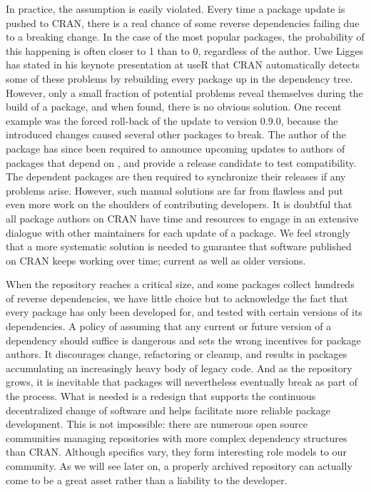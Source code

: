 In practice, the assumption is easily violated. Every time a package update is
pushed to CRAN, there is a real chance of some reverse dependencies failing due
to a breaking change. In the case of the most popular packages, the probability
of this happening is often closer to 1 than to 0, regardless of the author. Uwe
Ligges has stated in his keynote presentation at useR that CRAN automatically
detects some of these problems by rebuilding every package up in the dependency
tree. However, only a small fraction of potential problems reveal themselves
during the build of a package, and when found, there is no obvious solution. One
recent example was the forced roll-back of the  \citep{ggplot2}
update to version 0.9.0, because the introduced changes caused several other
packages to break. The author of the  package has since been
required to announce upcoming updates to authors of packages that depend on
, and provide a release candidate to test compatibility. The
dependent packages are then required to synchronize their releases if any
problems arise. However, such manual solutions are far from flawless and put
even more work on the shoulders of contributing developers. It is doubtful that
all package authors on CRAN have time and resources to engage in an extensive
dialogue with other maintainers for each update of a package. We feel strongly
that a more systematic solution is needed to guarantee that software published
on CRAN keeps working over time; current as well as older versions.

When the repository reaches a critical size, and some packages collect hundreds
of reverse dependencies, we have little choice but to acknowledge the fact that
every package has only been developed for, and tested with certain versions of
its dependencies. A policy of assuming that any current or future version of a
dependency should suffice is dangerous and sets the wrong incentives for package
authors. It discourages change, refactoring or cleanup, and results in packages
accumulating an increasingly heavy body of legacy code. And as the repository
grows, it is inevitable that packages will nevertheless eventually break as
part of the process.
What is needed is a redesign that supports the continuous decentralized change
of software and helps facilitate more reliable package development. This is not
impossible: there are numerous open source communities managing repositories with
more complex dependency structures than CRAN. Although specifics vary, they form
interesting role models to our community. As we will see later on, a properly
archived repository can actually come to be a great asset rather than a
liability to the developer.

